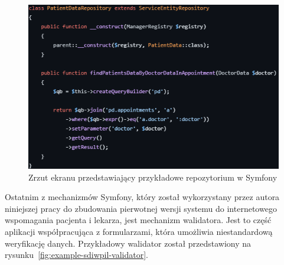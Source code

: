 \documentclass[12pt,oneside]{book}
\newcommand{\captionvspace}{\vspace{6pt}}
\begin{document}
    \begin{figure}[ht]
        \centering
        \includegraphics[width=\textwidth]{includes/images/example-repository-before-migration.png}
        \captionvspace
        \caption{Zrzut ekranu przedstawiający przykładowe repozytorium w Symfony}
        \label{fig:example-sdiwpil-repository}
    \end{figure}

    Ostatnim z mechanizmów Symfony, który został wykorzystany przez autora niniejszej pracy do zbudowania pierwotnej wersji systemu do internetowego wspomagania pacjenta i lekarza, jest mechanizm walidatora. Jest to część aplikacji współpracująca z formularzami, która umożliwia niestandardową weryfikację danych. Przykładowy walidator został przedstawiony na rysunku~\ref{fig:example-sdiwpil-validator}.
\end{document}
